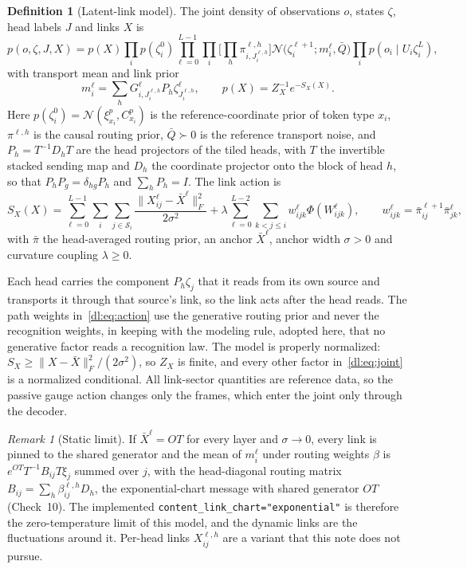 \documentclass[11pt]{article}
\theoremstyle{definition}
\newtheorem{definition}[theorem]{Definition}
\theoremstyle{remark}
\newtheorem{remark}[theorem]{Remark}
\providecommand{\cfg}[1]{{\small\texttt{#1}}}
\newcommand{\N}{\mathcal N}
\newcommand{\Qb}{\bar Q}
\begin{document}
\begin{definition}[Latent-link model]
\label{dl:def:model}
The joint density of observations $o$, states $\zeta$, head labels $J$ and links $X$ is
\begin{equation}
p(o,\zeta,J,X)=p(X)\prod_ip(\zeta_i^0)\prod_{\ell=0}^{L-1}\prod_i\Big[\prod_h\pi_{i,J_i^{\ell,h}}^{\ell,h}\Big]\N\big(\zeta_i^{\ell+1};m_i^\ell,\Qb\big)\prod_ip(o_i\mid U_i\zeta_i^L),
\label{dl:eq:joint}
\end{equation}
with transport mean and link prior
\begin{equation}
m_i^\ell=\sum_hG_{i,J_i^{\ell,h}}^\ell P_h\zeta_{J_i^{\ell,h}}^\ell,\qquad
p(X)=Z_X^{-1}e^{-S_X(X)}.
\label{dl:eq:mean}
\end{equation}
Here $p(\zeta_i^0)=\N(\xi^p_{x_i},C^p_{x_i})$ is the reference-coordinate prior of token type $x_i$, $\pi^{\ell,h}$ is the causal routing prior, $\Qb\succ0$ is the reference transport noise, and $P_h=T^{-1}D_hT$ are the head projectors of the tiled heads, with $T$ the invertible stacked sending map and $D_h$ the coordinate projector onto the block of head $h$, so that $P_hP_g=\delta_{hg}P_h$ and $\sum_hP_h=I$. The link action is
\begin{equation}
S_X(X)=\sum_{\ell=0}^{L-1}\sum_i\sum_{j\in\mathcal S_i}\frac{\|X_{ij}^\ell-\bar X^\ell\|_F^2}{2\sigma^2}
+\lambda\sum_{\ell=0}^{L-2}\sum_{k<j\le i}w_{ijk}^\ell\Phi(W_{ijk}^\ell),\qquad
w_{ijk}^\ell=\bar\pi_{ij}^{\ell+1}\bar\pi_{jk}^{\ell},
\label{dl:eq:action}
\end{equation}
with $\bar\pi$ the head-averaged routing prior, an anchor $\bar X^\ell$, anchor width $\sigma>0$ and curvature coupling $\lambda\ge0$.
\end{definition}

Each head carries the component $P_h\zeta_j$ that it reads from its own source and transports it through that source's link, so the link acts after the head reads. The path weights in~\eqref{dl:eq:action} use the generative routing prior and never the recognition weights, in keeping with the modeling rule, adopted here, that no generative factor reads a recognition law. The model is properly normalized: $S_X\ge\|X-\bar X\|_F^2/(2\sigma^2)$, so $Z_X$ is finite, and every other factor in~\eqref{dl:eq:joint} is a normalized conditional. All link-sector quantities are reference data, so the passive gauge action changes only the frames, which enter the joint only through the decoder.

\begin{remark}[Static limit]
\label{dl:rem:static}
If $\bar X^\ell=OT$ for every layer and $\sigma\to0$, every link is pinned to the shared generator and the mean of $m_i^\ell$ under routing weights $\beta$ is $e^{OT}T^{-1}B_{ij}T\xi_j$ summed over $j$, with the head-diagonal routing matrix $B_{ij}=\sum_h\beta_{ij}^{\ell,h}D_h$, the exponential-chart message with shared generator $OT$ (Check~10). The implemented \cfg{content\_link\_chart="exponential"} is therefore the zero-temperature limit of this model, and the dynamic links are the fluctuations around it. Per-head links $X_{ij}^{\ell,h}$ are a variant that this note does not pursue.
\end{remark}
\end{document}
